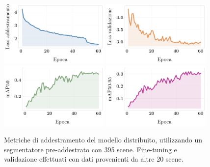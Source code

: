 \documentclass[12pt]{report}
\begin{document}
\begin{figure}[h!]
	\centering
	{\includegraphics[width=0.48\textwidth]{images/fog-robotics/real-to-real/8/train-loss}}
	\hspace{0.01\textwidth}
	{\includegraphics[width=0.48\textwidth]{images/fog-robotics/real-to-real/8/validation-loss}}
	\hspace{0.01\textwidth}
	\\
	{\includegraphics[width=0.48\textwidth]{images/fog-robotics/real-to-real/8/map50}}
	\hspace{0.01\textwidth}
	{\includegraphics[width=0.48\textwidth]{images/fog-robotics/real-to-real/8/map50-95}}
	\caption{Metriche di addestramento del modello distribuito, utilizzando un segmentatore pre-addestrato con 395 scene. Fine-tuning e validazione effettuati con dati provenienti da altre 20 scene.}
	\label{fig:training-6}
\end{figure}
\end{document}
